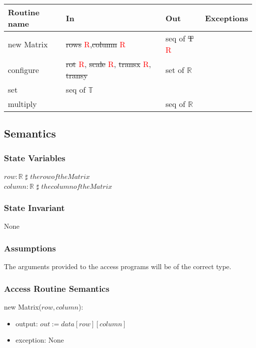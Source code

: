 \documentclass[12pt]{article}
\begin{document}
\begin{tabular}{| l | l | l | p{5cm} |}
\hline
\textbf{Routine name} & \textbf{In} & \textbf{Out} & \textbf{Exceptions}\\
\hline
new Matrix & \sout{rows} \textcolor{red}{R},\sout{column} \textcolor{red}{R}  & seq of \sout{T} \textcolor{red}{R}  & ~\\
\hline
configure &\sout{rot} \textcolor{red}{R}, \sout{scale} \textcolor{red}{R}, \sout{transx} \textcolor{red}{R}, \sout{transy} & set of $\mathbb{R}$ & ~\\
\hline
set & seq of $\mathbb{T}$ & ~ & ~\\
\hline
multiply & ~ & seq of $\mathbb{R}$ & ~\\
\hline

\end{tabular}
\subsection* {Semantics}

\subsubsection* {State Variables}

$row: \mathbb{R}$ $\sharp$ $the row of the Matrix$\\
$column: \mathbb{R}$  $\sharp$ $the column of the Matrix$\\


\subsubsection* {State Invariant}
None

\subsubsection* {Assumptions}

The arguments provided to the access programs will be of the correct type.

\subsubsection* {Access Routine Semantics}

\noindent new Matrix($row, column$):
\begin{itemize}
\item output: $out := data[row][column]$
\item exception: None
\end{itemize}
\end{document}
